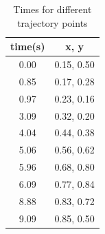 \documentclass[12pt, twoside, a4paper, titlepage]{article}
\begin{document}
\begin{table}
\begin{center}
\caption{Times for different trajectory points} \label{times}
\begin{tabular}{| c | c |}
\hline
time(s) & x, y \\
\hline
0.00 & 0.15, 0.50 \\
\hline
0.85 & 0.17, 0.28 \\
\hline
0.97 & 0.23, 0.16 \\
\hline
3.09 & 0.32, 0.20 \\
\hline
4.04 & 0.44, 0.38 \\
\hline
5.06 & 0.56, 0.62 \\
\hline
5.96 & 0.68, 0.80 \\
\hline
6.09 & 0.77, 0.84 \\
\hline
8.88 & 0.83, 0.72 \\
\hline
9.09 & 0.85, 0.50 \\
\hline
\end{tabular}
\end{center}
\end{table}
\end{document}
